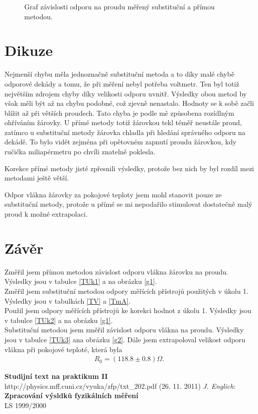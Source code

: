 \documentclass[a4paper,12pt]{article}
\begin{document}
\begin{figure}

\caption{Graf závislosti odporu na proudu měřený substituční a přímou metodou.}
\label{g3}
\end{figure}

\section{Dikuze}
Nejmenší chybu měla jednoznačně substituční metoda a to díky malé chybě odporové dekády a tomu, 
že při měření nebyl potřeba voltmetr. Ten byl totiž největším zdrojem chyby díky velikosti odporu 
uvnitř. Výsledky obou metod by však měli být až na chybu podobné, což zjevně nenastalo. Hodnoty 
se k sobě začli blížit až při větších proudech. Tato chyba je podle mě způsobena rozídlným 
ohříváním žárovky. U přímé metody totiž žárovkou tekl téměř neustále proud, zatímco u substituční 
metody žárovka chladla při hledání správného odporu na dekádě. To bylo vidět zejména při 
opětovném zapnutí proudu žárovkou, kdy ručička miliapérmetru po chvíli znatelně poklesla.

Korekce přímé metody jistě zpřesnili výsledky, protože bez nich by byl rozdíl mezi metodami ještě 
větší.

Odpor vlákna žárovky za pokojové teploty jsem mohl stanovit pouze ze substituční metody, protože 
u přímé  se mi nepodařilo stimulovat dostatečně malý proud k možné extrapolaci.

\section{Závěr}
Změřil jsem přímou metodou závislost odporu vlákna žárovku na proudu. Výsledky jsou v tabulce 
\ref{TUk1} a na obrázku \ref{g1}.\\
Změřil jsem substituční metodou odpory měřících přístrojů použitých v úkolu 1. Výsledky jsou 
v tabulkách \ref{TV} a \ref{TmA}.\\
Použil jsem odpory měřících přístrojů ke korekci hodnot z úkolu 1. Výsledky jsou v tabulce 
\ref{TUk2} a na obrázku \ref{g1}. \\
Substituční metodou jsem změřil závislost odporu vlákna na proudu. Výsledky jsou v tabulce 
\ref{TUk3} ana obrázku \ref{g2}. Dále jsem extrapoloval velikost odporu vlákna při pokojové 
teploté, která byla
\begin{eqnarray}
R_0=(118.8\pm0.8)\Omega.
\end{eqnarray}

\begin{thebibliography}{5}
	 \textbf{Studijní text na praktikum II} \\http://physics.mff.cuni.cz/vyuka/zfp/txt\_202.pdf (26. 11. 2011)
     \emph{J. Englich}: \textbf{Zpracování výsldků fyzikálních měření} \\ LS 1999/2000
\end{thebibliography}
\end{document}
